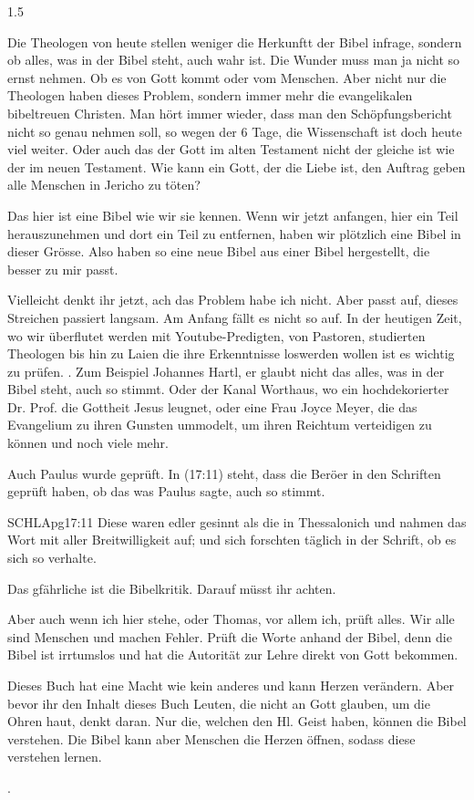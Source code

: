 \documentclass[fontsize=14pt]{../../inc/mybib}
\begin{document}
\begin{spacing}{1.5}
\begin{block}[Einführung]
    Die Theologen von heute stellen weniger die Herkunftt der Bibel infrage, sondern ob alles, was in der Bibel steht, auch wahr ist. Die Wunder muss man ja nicht so ernst nehmen. Ob es von Gott kommt oder vom Menschen. Aber nicht nur die Theologen haben dieses Problem, sondern immer mehr die evangelikalen bibeltreuen Christen. Man hört immer wieder, dass man den Schöpfungsbericht nicht so genau nehmen soll, so wegen der 6 Tage, die Wissenschaft ist doch heute viel weiter. Oder auch das der Gott im alten Testament nicht der gleiche ist wie der im neuen Testament. Wie kann ein Gott, der die Liebe ist, den Auftrag geben alle Menschen in Jericho zu töten?

    Das hier ist eine Bibel wie wir sie kennen. Wenn wir jetzt anfangen, hier ein Teil herauszunehmen und dort ein Teil zu entfernen, haben wir plötzlich eine Bibel in dieser Grösse. Also haben so eine neue Bibel aus einer Bibel hergestellt, die  besser zu mir passt.
    
    Vielleicht denkt ihr jetzt, ach das Problem habe ich nicht. Aber passt auf, dieses Streichen passiert langsam. Am Anfang fällt es nicht so auf. In der heutigen Zeit, wo wir überflutet werden mit Youtube-Predigten, von Pastoren,  studierten Theologen bis hin zu Laien die ihre Erkenntnisse loswerden wollen ist es wichtig zu prüfen. . Zum Beispiel Johannes Hartl, er glaubt nicht das alles, was in der Bibel steht, auch so stimmt. Oder der Kanal Worthaus, wo ein hochdekorierter Dr. Prof. die Gottheit Jesus leugnet, oder eine Frau Joyce Meyer, die das Evangelium zu ihren Gunsten ummodelt, um ihren Reichtum verteidigen zu können und noch viele mehr. 

    Auch Paulus wurde geprüft. In (17:11) steht, dass die Beröer in den Schriften geprüft haben, ob das was Paulus sagte, auch so stimmt.

    \begin{bibelbox}{SCHL}{Apg}{17:11}
    Diese waren edler gesinnt als die in Thessalonich und nahmen das Wort mit aller Breitwilligkeit auf; und sich forschten täglich in der Schrift, ob es sich so verhalte.
    \end{bibelbox}

    Das gfährliche ist die Bibelkritik. Darauf müsst ihr achten.
    
    Aber auch wenn ich hier stehe, oder Thomas, vor allem ich, prüft alles. Wir alle sind Menschen und machen Fehler. Prüft die Worte anhand der Bibel, denn die Bibel ist irrtumslos und hat die Autorität zur Lehre direkt von Gott bekommen.

    Dieses Buch hat eine Macht wie kein anderes und kann Herzen verändern. Aber bevor ihr den Inhalt dieses Buch Leuten, die nicht an Gott glauben, um die Ohren haut, denkt daran. Nur die, welchen den Hl. Geist haben, können die Bibel verstehen. Die Bibel kann aber Menschen die Herzen öffnen, sodass diese verstehen lernen.
    \end{block}

    .
   
\end{spacing}
\end{document}
